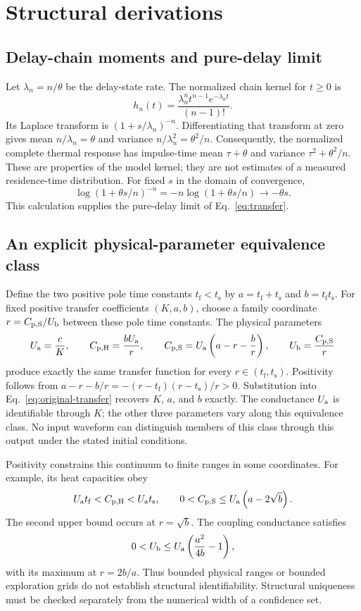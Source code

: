 \section{Structural derivations}
\label{sec:structural}

\subsection{Delay-chain moments and pure-delay limit}
Let $\lambda_n=n/\theta$ be the delay-state rate. The normalized chain kernel for
$t\geq0$ is
\[
 h_n(t)=\frac{\lambda_n^n t^{n-1}e^{-\lambda_n t}}{(n-1)!}.
\]
Its Laplace transform is $(1+s/\lambda_n)^{-n}$. Differentiating that transform at zero
gives mean $n/\lambda_n=\theta$ and variance $n/\lambda_n^2=\theta^2/n$. Consequently, the
normalized complete thermal response has impulse-time mean $\tau+\theta$ and
variance $\tau^2+\theta^2/n$. These are properties of the model kernel;
they are not estimates of a measured residence-time distribution.
For fixed $s$ in the domain of convergence,
\[
 \log(1+\theta s/n)^{-n}=-n\log(1+\theta s/n)\longrightarrow-\theta s.
\]
This calculation supplies the pure-delay limit of Eq.~\eqref{eq:transfer}.

\subsection{An explicit physical-parameter equivalence class}
Define the two positive pole time constants $t_{\mathrm f}<t_{\mathrm s}$ by
$a=t_{\mathrm f}+t_{\mathrm s}$ and $b=t_{\mathrm f}t_{\mathrm s}$. For fixed
positive transfer coefficients $(K,a,b)$, choose a family coordinate
$r=C_{\mathrm{p,S}}/U_{\mathrm b}$ between these pole time constants. The physical parameters
\begin{equation}
 U_{\mathrm a}=\frac{c}{K},\qquad
 C_{\mathrm{p,H}}=\frac{bU_{\mathrm a}}{r},\qquad
 C_{\mathrm{p,S}}=U_{\mathrm a}\left(a-r-\frac{b}{r}\right),\qquad
 U_{\mathrm b}=\frac{C_{\mathrm{p,S}}}{r}
 \label{eq:equivalent}
\end{equation}
produce exactly the same transfer function for every
$r\in(t_{\mathrm f},t_{\mathrm s})$. Positivity follows from
$a-r-b/r=-(r-t_{\mathrm f})(r-t_{\mathrm s})/r>0$. Substitution into
Eq.~\eqref{eq:original-transfer} recovers $K$, $a$, and $b$ exactly.
The conductance $U_{\mathrm a}$ is identifiable through $K$; the other three parameters
vary along this equivalence class. No input waveform can distinguish members
of this class through this output under the stated initial conditions.

Positivity constrains this continuum to finite ranges in some coordinates.
For example, its heat capacities obey
\[
 U_{\mathrm a} t_{\mathrm f}<C_{\mathrm{p,H}}<U_{\mathrm a} t_{\mathrm s},\qquad
 0<C_{\mathrm{p,S}}\leq U_{\mathrm a}\left(a-2\sqrt b\right).
\]
The second upper bound occurs at $r=\sqrt b$.
The coupling conductance satisfies
\[
 0<U_{\mathrm b}\leq U_{\mathrm a}\left(\frac{a^2}{4b}-1\right),
\]
with its maximum at $r=2b/a$.
Thus bounded physical ranges or bounded exploration grids do not establish
structural identifiability. Structural uniqueness must be checked separately
from the numerical width of a confidence set.

